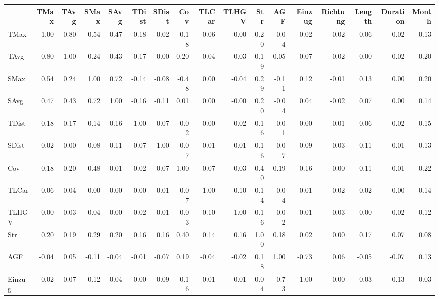\begin{tabular}{lrrrrrrrrrrrrrrrr}
\toprule
{} &  TMax &  TAvg &  SMax &  SAvg &  TDist &  SDist &   Cov &  TLCar &  TLHGV &  Str &   AGF &  Einzug &  Richtung &  Length &  Duration &  Month \\
\midrule
TMax     &  1.00 &  0.80 &  0.54 &  0.47 &  -0.18 &  -0.02 & -0.18 &   0.06 &   0.00 & 0.20 & -0.04 &    0.02 &      0.02 &    0.06 &      0.02 &   0.13 \\
TAvg     &  0.80 &  1.00 &  0.24 &  0.43 &  -0.17 &  -0.00 &  0.20 &   0.04 &   0.03 & 0.19 &  0.05 &   -0.07 &      0.02 &   -0.00 &      0.02 &   0.20 \\
SMax     &  0.54 &  0.24 &  1.00 &  0.72 &  -0.14 &  -0.08 & -0.48 &   0.00 &  -0.04 & 0.29 & -0.11 &    0.12 &     -0.01 &    0.13 &      0.00 &   0.20 \\
SAvg     &  0.47 &  0.43 &  0.72 &  1.00 &  -0.16 &  -0.11 &  0.01 &   0.00 &  -0.00 & 0.20 & -0.04 &    0.04 &     -0.02 &    0.07 &      0.00 &   0.14 \\
TDist    & -0.18 & -0.17 & -0.14 & -0.16 &   1.00 &   0.07 & -0.02 &   0.00 &   0.02 & 0.16 & -0.01 &    0.00 &      0.01 &   -0.06 &     -0.02 &   0.15 \\
SDist    & -0.02 & -0.00 & -0.08 & -0.11 &   0.07 &   1.00 & -0.07 &   0.01 &   0.01 & 0.16 & -0.07 &    0.09 &      0.03 &   -0.11 &     -0.01 &   0.13 \\
Cov      & -0.18 &  0.20 & -0.48 &  0.01 &  -0.02 &  -0.07 &  1.00 &  -0.07 &  -0.03 & 0.40 &  0.19 &   -0.16 &     -0.00 &   -0.11 &     -0.01 &   0.22 \\
TLCar    &  0.06 &  0.04 &  0.00 &  0.00 &   0.00 &   0.01 & -0.07 &   1.00 &   0.10 & 0.14 & -0.04 &    0.01 &     -0.02 &    0.02 &      0.00 &   0.14 \\
TLHGV    &  0.00 &  0.03 & -0.04 & -0.00 &   0.02 &   0.01 & -0.03 &   0.10 &   1.00 & 0.16 & -0.02 &    0.01 &      0.03 &    0.00 &      0.02 &   0.12 \\
Str      &  0.20 &  0.19 &  0.29 &  0.20 &   0.16 &   0.16 &  0.40 &   0.14 &   0.16 & 1.00 &  0.18 &    0.02 &      0.00 &    0.17 &      0.07 &   0.08 \\
AGF      & -0.04 &  0.05 & -0.11 & -0.04 &  -0.01 &  -0.07 &  0.19 &  -0.04 &  -0.02 & 0.18 &  1.00 &   -0.73 &      0.06 &   -0.05 &     -0.07 &   0.13 \\
Einzug   &  0.02 & -0.07 &  0.12 &  0.04 &   0.00 &   0.09 & -0.16 &   0.01 &   0.01 & 0.04 & -0.73 &    1.00 &      0.00 &    0.03 &     -0.13 &   0.03 \\

\end{tabular}
